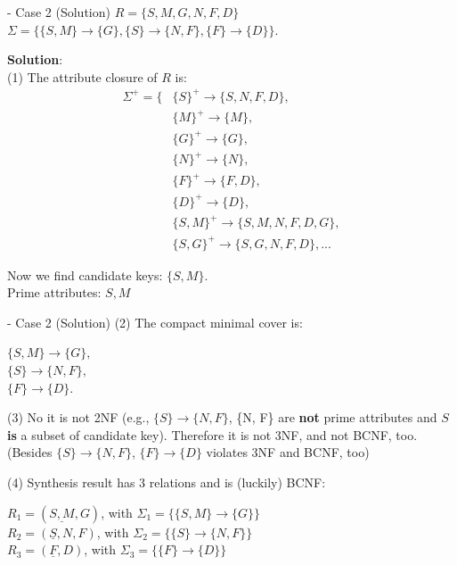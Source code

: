 \begin{frame}[fragile]{ - Case 2 (Solution)}
	$R = \{S, M, G, N, F, D\}$\\
	$\Sigma = \{\{S, M\} \rightarrow \{G\}, 
	\{S\} \rightarrow \{N, F\},
	\{F\} \rightarrow \{D\}\}$.\\\vspace{5pt}
	
	\textbf{Solution}:\\
	(1) The attribute closure of $R$ is:
	\begin{align*} 
		\Sigma^{+} = \{&\{S\}^{+} \rightarrow \{S, N, F, D\},\\
		&\{M\}^{+} \rightarrow \{M\},\\
		&\{G\}^{+} \rightarrow \{G\},\\
		&\{N\}^{+} \rightarrow \{N\},\\
		&\{F\}^{+} \rightarrow \{F, D\},\\
		&\{D\}^{+} \rightarrow \{D\},\\
		&\{{S, M}\}^{+} \rightarrow \{S, M, N, F, D, G\},\\
		&\{{S, G}\}^{+} \rightarrow \{S, G, N, F, D\}, ...
	\end{align*} 
	
	Now we find candidate keys: $\{S, M\}$.\\
	Prime attributes: $S, M$
\end{frame}

\begin{frame}[fragile]{ - Case 2 (Solution)}
	(2) The compact minimal cover is:\\\vspace{5pt}
	
	$\{S, M\} \rightarrow \{G\},$\\
	$\{S\}  \rightarrow \{N, F\},$\\
	$\{F\} \rightarrow \{D\}.$\\\vspace{5pt}
	
	(3)  No it is not 2NF (e.g., $\{S\}\rightarrow\{N, F\}$, \{N, F\} are \textbf{not} prime attributes and $S$ \textbf{is} a subset of candidate key). Therefore it is not 3NF, and not BCNF, too.\\
	(Besides $\{S\}\rightarrow\{N, F\}$, $\{F\}\rightarrow\{D\}$ violates 3NF and BCNF, too)
	\vspace{5pt}
	
	(4) Synthesis result has 3 relations and is (luckily) BCNF: \\\vspace{5pt}
	
	$R_1 = (\underline{S,M}, G)$, with $\Sigma_1 =\{\{S,M\} \rightarrow \{G\}\}$\\
	$R_2 = (\underline{S}, N, F)$, with $\Sigma_2 =\{\{S\} \rightarrow \{N,F\}\}$\\
	$R_3 = (\underline{F}, D)$, with $\Sigma_3 =\{\{F\} \rightarrow \{D\}\}$\\\vspace{5pt}
	
\end{frame}

